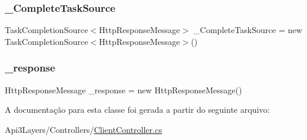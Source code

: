 \subsubsection{\texorpdfstring{\+\_\+\+Complete\+Task\+Source}{\_CompleteTaskSource}}
{\footnotesize\ttfamily Task\+Completion\+Source$<$Http\+Response\+Message$>$ \+\_\+\+Complete\+Task\+Source = new Task\+Completion\+Source$<$Http\+Response\+Message$>$()\hspace{0.3cm}{\ttfamily [private]}}

\mbox{\label{classApi3Layers_1_1Controllers_1_1ClientController_addf535da0da455d00a0bd7a519f618cb}} 
\subsubsection{\texorpdfstring{\+\_\+response}{\_response}}
{\footnotesize\ttfamily Http\+Response\+Message \+\_\+response = new Http\+Response\+Message()\hspace{0.3cm}{\ttfamily [private]}}



A documentação para esta classe foi gerada a partir do seguinte arquivo\+:\begin{DoxyCompactItemize}
\item 
Api3\+Layers/\+Controllers/\hyperlink{ClientController_8cs}{Client\+Controller.\+cs}\end{DoxyCompactItemize}
